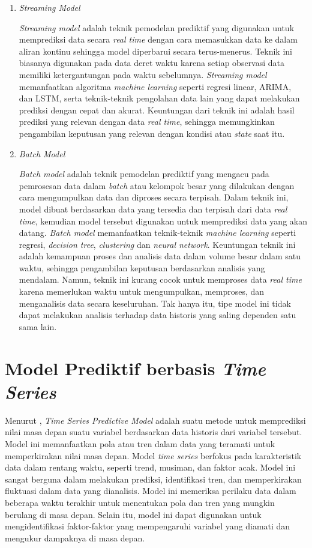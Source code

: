 \begin{enumerate}
    \item \textit{Streaming Model}
    
    \textit{Streaming model} adalah teknik pemodelan prediktif yang digunakan untuk memprediksi data secara \textit{real time} dengan cara memasukkan data ke dalam aliran kontinu sehingga model diperbarui secara terus-menerus. Teknik ini biasanya digunakan pada data deret waktu karena setiap observasi data memiliki ketergantungan pada waktu sebelumnya. \textit{Streaming model} memanfaatkan algoritma \textit{machine learning} seperti regresi linear, ARIMA, dan LSTM, serta teknik-teknik pengolahan data lain yang dapat melakukan prediksi dengan cepat dan akurat. Keuntungan dari teknik ini adalah hasil prediksi yang relevan dengan data \textit{real time}, sehingga memungkinkan pengambilan keputusan yang relevan dengan kondisi atau \textit{state} saat itu.

    \item \textit{Batch Model}
    
    \textit{Batch model} adalah teknik pemodelan prediktif yang mengacu pada pemrosesan data dalam \textit{batch} atau kelompok besar yang dilakukan dengan cara mengumpulkan data dan diproses secara terpisah. Dalam teknik ini, model dibuat berdasarkan data yang tersedia dan terpisah dari data \textit{real time}, kemudian model tersebut digunakan untuk memprediksi data yang akan datang. \textit{Batch model} memanfaatkan teknik-teknik \textit{machine learning} seperti regresi, \textit{decision tree}, \textit{clustering} dan \textit{neural network}. Keuntungan teknik ini adalah kemampuan proses dan analisis data dalam volume besar dalam satu waktu, sehingga pengambilan keputusan berdasarkan analisis yang mendalam. Namun, teknik ini kurang cocok untuk memproses data \textit{real time} karena memerlukan waktu untuk mengumpulkan, memproses, dan menganalisis data secara keseluruhan. Tak hanya itu, tipe model ini tidak dapat melakukan analisis terhadap data historis yang saling dependen satu sama lain.
\end{enumerate}

\section{Model Prediktif berbasis \textit{Time Series}}
Menurut \parencite{timeseriesanalysis}, \textit{Time Series Predictive Model} adalah suatu metode untuk memprediksi nilai masa depan suatu variabel berdasarkan data historis dari variabel tersebut. Model ini memanfaatkan pola atau tren dalam data yang teramati untuk memperkirakan nilai masa depan. Model \textit{time series} berfokus pada karakteristik data dalam rentang waktu, seperti trend, musiman, dan faktor acak. Model ini sangat berguna dalam melakukan prediksi, identifikasi tren, dan memperkirakan fluktuasi dalam data yang dianalisis. Model ini memeriksa perilaku data dalam beberapa waktu terakhir untuk menentukan pola dan tren yang mungkin berulang di masa depan. Selain itu, model ini dapat digunakan untuk mengidentifikasi faktor-faktor yang mempengaruhi variabel yang diamati dan mengukur dampaknya di masa depan.

